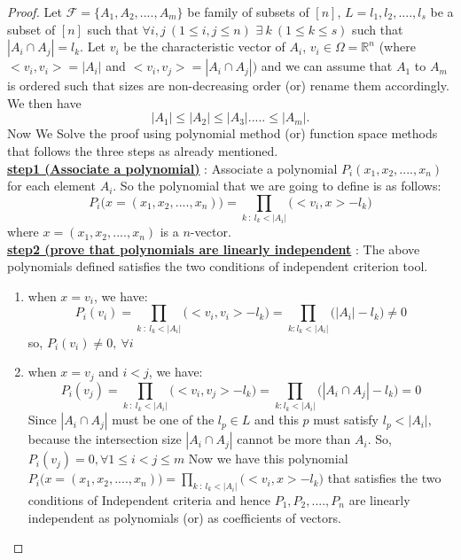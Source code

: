 \begin{proof}
Let $\mathcal{F} = \{A_1,A_2,....,A_m\}$ be family of subsets of $[n]$, $L={l_1,l_2,....,l_s}$ be a subset of $[n]$ such that $\forall i,j ~(1 \le i,j \le n)$ $\exists~ k~(1 \le k \le s)$ such that $|A_i\cap A_j| = l_k$. Let $v_i$ be the characteristic vector of $A_i$, $v_i \in \Omega = \mathbb{R}^n$ \big(where $<v_i,v_i> = |A_i|$ and $<v_i,v_j> = |A_i\cap A_j|\big)$ and we can assume that $A_1$ to $A_m$ is ordered such that sizes are non-decreasing order (or) rename them accordingly. We then have
$$|A_1| \le |A_2|  \le |A_3|..... \le |A_m|.$$ 
Now We Solve the proof using polynomial method (or) function space methods that follows the three steps as already mentioned.
\\

\underline{\textbf{step1 (Associate a polynomial)}} : 
Associate a polynomial $P_i(x_1,x_2,....,x_n)$ for each element $A_i$. So the polynomial that we are going to define is as follows:
$$P_i\big(x = (x_1,x_2,....,x_n)\big) = \prod_{k ~: ~l_k < |A_i|}\big(<v_i,x>-l_k\big)$$
where $x=(x_1,x_2,....,x_n)$ is a $n$-vector.
\\


\underline{\textbf{step2 (prove that polynomials are linearly independent}} : The above polynomials defined satisfies the two conditions of independent criterion tool.
\begin{enumerate}
    \item 
    when $x=v_i$, we have:
$$P_i(v_i) = \prod_{k ~: ~l_k < |A_i|}\big(<v_i,v_i>-l_k\big) = \prod_{k:l_k < |A_i|}\bigg(|A_i|-l_k\bigg) \ne 0$$
so, $P_i(v_i) \ne 0,~ \forall i$
    \item
    when $x=v_j$ and $i < j$, we have:
$$P_i(v_j) = \prod_{k ~: ~l_k < |A_i|}\big(<v_i,v_j>-l_k\big) = \prod_{k:l_k < |A_i|}\big(|A_i\cap A_j|-l_k\big)=0$$
Since $|A_i \cap A_j| $ must be one of the $l_p \in L$ and this $p$ must satisfy $l_p < |A_i|$, because the intersection size $|A_i \cap A_j|$ cannot be more than $A_i$.
So, $P_i(v_j) = 0, \forall 1 \le i <j \le m$
Now we have this polynomial $P_i\big(x = (x_1,x_2,....,x_n)\big) = \prod_{k ~: ~l_k < |A_i|}\big(<v_i,x>-l_k\big)$ that satisfies the two conditions of Independent criteria and hence $P_1,P_2,....,P_n$ are linearly independent as polynomials (or) as coefficients of vectors.
\end{enumerate}


\end{proof}
